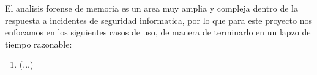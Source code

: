 El analisis forense de memoria es un area muy amplia y compleja dentro de la
respuesta a incidentes de seguridad informatica, por lo que para este proyecto
nos enfocamos en los siguientes casos de uso, de manera de terminarlo en un
lapzo de tiempo razonable:

\begin{enumerate}

\item (...)

\end{enumerate}

